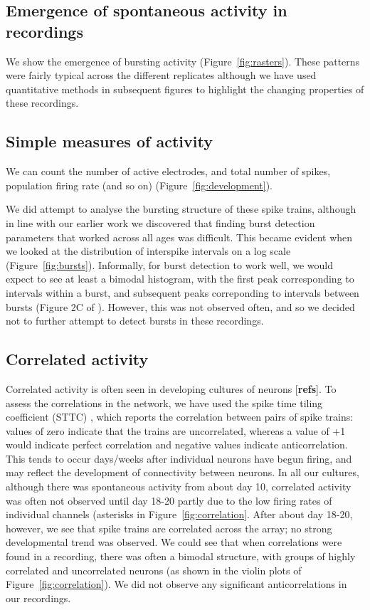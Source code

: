 \documentclass[doublespacing]{bmcart}
\begin{document}
\subsection*{Emergence of spontaneous activity in recordings}
We show the emergence of bursting activity (Figure~\ref{fig:rasters}).  These patterns were fairly typical across the different replicates although we have used quantitative methods in subsequent figures to highlight the changing properties of these recordings.

\subsection*{Simple measures of activity}
We can count the number of active electrodes, and total number of
spikes, population firing rate (and so on)
(Figure~\ref{fig:development}).

We did attempt to analyse the bursting structure of these spike
trains, although in line with our earlier work \cite{Cotterill2016-qi}
we discovered that finding burst detection parameters that worked across
all ages was difficult.  This became evident when we looked at the
distribution of interspike intervals on a log scale
(Figure~\ref{fig:bursts}).  Informally, for burst detection to work
well, we would expect to see at least a bimodal histogram, with the
first peak corresponding to intervals within a burst, and subsequent
peaks correponding to intervals between bursts (Figure 2C of
\cite{Charlesworth2015-gv}).  However, this was not observed often,
and so we decided not to further attempt to detect bursts in these
recordings.

\subsection*{Correlated activity}

Correlated activity is often seen in developing cultures of neurons
[\textbf{refs}].  To assess the correlations in the network, we have used the spike time tiling coefficient (STTC) \cite{Cutts2014}, which reports the correlation between pairs of spike trains: values of zero indicate that the trains are uncorrelated, whereas a value of +1 would indicate perfect correlation and negative values indicate anticorrelation.  This tends to occur days/weeks after individual neurons have
begun firing, and may reflect the development of connectivity between
neurons.  In all our cultures, although there was spontaneous activity
from about day 10, correlated activity was often not observed until
day 18-20 partly due to the low firing rates of individual channels
(asterisks in Figure~\ref{fig:correlation}.  After about day 18-20,
however, we see that spike trains are correlated across the array; no
strong developmental trend was observed.  We could see that
when correlations were found in a recording, there was often a bimodal
structure, with groups of highly correlated and uncorrelated neurons
(as shown in the violin plots of Figure~\ref{fig:correlation}).  We did not observe any significant anticorrelations in our recordings.
\end{document}
